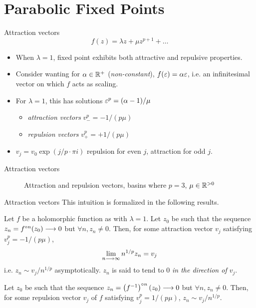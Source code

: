 \section{Parabolic Fixed Points}
\sectiontitleframe

\begin{frame}{Attraction vectors}
    \begin{equation*}
        f(z)=\lambda z + \mu z^{p + 1} + \dots
    \end{equation*}
    \begin{itemize}
        \item When $\lambda = 1$, fixed point exhibits both attractive and repulsive properties.
        \item Consider wanting for $\alpha\in\mathbb{R}^+$ (\emph{non-constant}),  $f(\varepsilon)=\alpha\varepsilon$, i.e. an infinitesimal vector on which $f$ acts as scaling. 
        \item For $\lambda = 1$, this has solutions $\varepsilon^p=(\alpha - 1)/\mu$
        \begin{itemize}
            \item \emph{attraction vectors} $v_-^p = -1/(p\mu)$
            \item \emph{repulsion vectors} $v_+^p = +1/(p\mu)$
        \end{itemize}
        \item $v_j = v_0\exp(j/p\cdot \pi i)$ repulsion for even $j$, attraction for odd $j$.
    \end{itemize}
\end{frame}
\begin{frame}{Attraction vectors}
    \begin{figure}
        \centering
        
        \caption{Attraction and repulsion vectors, basins where $p = 3$, $\mu\in\mathbb{R}^{> 0}$}
    \end{figure}
\end{frame}
\begin{frame}{Attraction vectors}
    This intuition is formalized in the following results.
    \newline
    \begin{thm}
        Let $f$ be a holomorphic function as with $\lambda = 1$. Let $z_0$ be such that the sequence $z_n=f^{\circ n}(z_0)\longrightarrow 0$ but $\forall n, z_n\ne 0$. Then, for some attraction vector $v_j$ satisfying $v_j^p=-1/(p\mu)$,
        \begin{equation*}
            \lim_{n\longrightarrow\infty} n^{1/p} z_n = v_j
        \end{equation*}
        i.e. $z_n\sim v_j/n^{1/p}$ asymptotically. $z_n$ is said to tend to 0 \emph{in the direction of $v_j$}.
    \end{thm}
    \begin{cor}
        Let $z_0$ be such that the sequence $z_n=\left(f^{-1}\right)^{\circ n}(z_0)\longrightarrow 0$ but $\forall n, z_n\ne 0$. Then, for some repulsion vector $v_j$ of $f$ satisfying $v_j^p = 1/(p\mu)$, $z_n\sim v_j/n^{1/p}$.
    \end{cor}
\end{frame}
